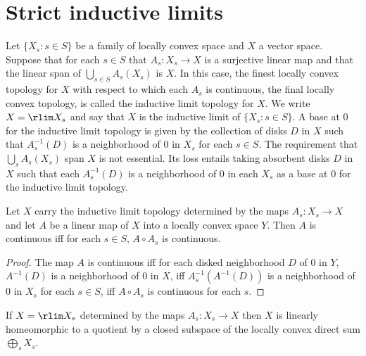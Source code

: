 \section{Strict inductive limits}
Let $\{X_s:s\in S\}$ be a family of locally convex space and $X$ a vector space. Suppose that for each $s\in S$ that $A_s:X_s\to X$ is a surjective linear map and that the linear span of $\bigcup_{s\in S}A_s(X_s)$ is $X$. In this case, the finest locally convex topology for $X$ with respect to which each $A_s$ is continuous, the final locally convex topology, is called the inductive limit topology for $X$. We write $X=\rlim X_s$ and say that $X$ is the inductive limit of $\{X_s:s\in S\}$.
A base at $0$ for the inductive limit topology is given by the collection of disks $D$ in $X$ such that $A_s^{-1}(D)$ is a neighborhood of $0$ in $X_s$ for each $s\in S$. The requirement that $\bigcup_sA_s(X_s)$ span $X$ is not essential. Its loss entails taking absorbent disks $D$ in $X$ such that each $A_s^{-1}(D)$ is a neighborhood of $0$ in each $X_s$ as a base at $0$ for the inductive limit topology.
\begin{proposition}\label{LCS inductive limit topo continuous iff}
Let $X$ carry the inductive limit topology determined by the maps $A_s:X_s\to X$ and let $A$ be a linear map of $X$ into a locally convex space $Y$. Then $A$ is continuous iff for each $s\in S$, $A\circ A_s$ is continuous.
\end{proposition}
\begin{proof}
The map $A$ is continuous iff for each disked neighborhood $D$ of $0$ in $Y$, $A^{-1}(D)$ is a neighborhood of $0$ in $X$, iff $A_s^{-1}(A^{-1}(D))$ is a neighborhood of $0$ in $X_s$ for each $s\in S$, iff $A\circ A_s$ is continuous for each $s$.
\end{proof}
\begin{proposition}\label{LCS inductive limit is subspace of direct sum}
If $X=\rlim X_s$ determined by the maps $A_s:X_s\to X$ then $X$ is linearly homeomorphic to a quotient by a closed subspace of the locally convex direct sum $\bigoplus_sX_s$.
\end{proposition}
